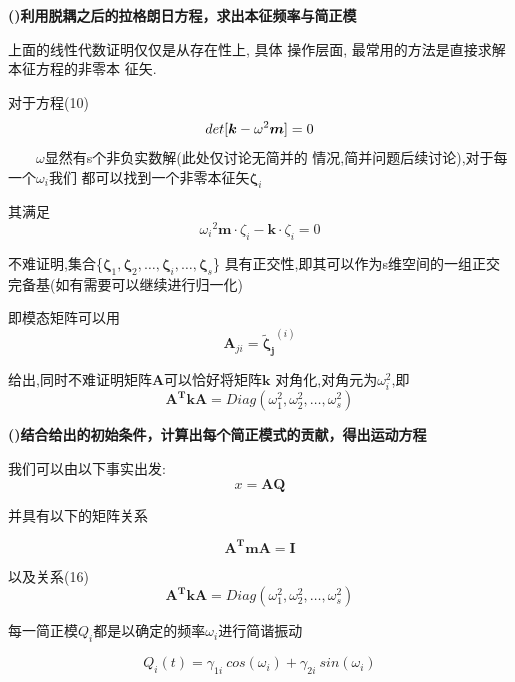 \documentclass[11pt, a4paper, oneside]{ctexart}
\begin{document}
{\textbf{()利用脱耦之后的拉格朗日方程，求出本征频率与简正模}

上面的线性代数证明仅仅是从存在性上, 具体
操作层面, 最常用的方法是直接求解本征方程的非零本
征矢.



对于方程(10)
{{$$\large det[\bm{k}-\omega^2\bm{m}]=0$$}}
$\qquad\omega$显然有s个非负实数解(此处仅讨论无简并的
情况,简并问题后续讨论),对于每一个$\omega_i$我们
都可以找到一个非零本征矢$\bm\zeta_i$

其满足
\begin{equation}
    {\omega_i}^2\bm{m}\cdot {\zeta_i}-\bm{k}\cdot {\zeta_i}=0
\end{equation}

不难证明,集合\{{${\bm\zeta_1,\bm\zeta_2,\dots,\bm\zeta_i,\dots,\bm\zeta_s}$\}
}具有正交性,即其可以作为s维空间的一组正交完备基(如有需要可以继续进行归一化)

即模态矩阵可以用
\begin{equation}
    {\mathbf{A}_{ji}=} {\boldsymbol{\tilde\zeta_j}^{(i)}}
\end{equation}

给出,同时不难证明矩阵$\mathbf A$可以恰好将矩阵$\mathbf k$
对角化,对角元为$\omega^2_i$,即
\begin{equation}
    \mathbf{A^TkA}=Diag(\omega_1^2,\omega_2^2,\dots,\omega_s^2)
\end{equation}


\textbf{()结合给出的初始条件，计算出每个简正模式的贡献，得出运动方程}

我们可以由以下事实出发:
\begin{equation}
    x= \mathbf{AQ}
\end{equation}

并具有以下的矩阵关系

\begin{equation}
    \mathbf{A^TmA=I}
\end{equation}


以及关系(16)
$$\mathbf{A^TkA}=Diag(\omega_1^2,\omega_2^2,\dots,\omega_s^2)$$

每一简正模$Q_i$都是以确定的频率$\omega_i$进行简谐振动

\begin{equation}
    Q_i(t)={\gamma_{1i}}\ cos(\omega_i)+{\gamma_{2i}}\ sin(\omega_i)
\end{equation}

}
\end{document}
